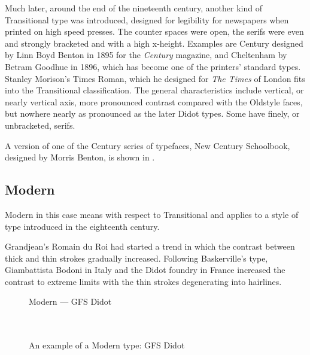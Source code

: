 \documentclass[10pt,letterpaper,extrafontsizes]{memoir}
\begin{document}
    Much later, around the end of the nineteenth century, another kind of 
Transitional type was introduced, designed for legibility for newspapers 
when printed on high speed presses. The counter spaces were open, the 
serifs were even and strongly bracketed and with a high x-height.
Examples are Century designed by 
 Linn Boyd Benton in 1895 for the \emph{Century}
magazine, and 
Cheltenham by Betram Goodhue 
in 1896, which has become one of the printers' standard types. Stanley
Morison's Times Roman, 
which he
designed for \emph{The Times} of London fits into the Transitional
classification. The general characteristics include vertical, or nearly
vertical axis, more pronounced contrast compared with the Oldstyle faces, but
nowhere nearly as pronounced as the later Didot types. Some have finely, or
unbracketed, serifs.

    A version of one of the Century 
series of typefaces, 
New Century Schoolbook, designed
by Morris Benton,
is shown in .

\subsection{Modern}

    Modern in this case means with respect to Transitional 
and applies to a style of type introduced in the eighteenth century.

    Grandjean's Romain du Roi had started a trend 
in which the contrast 
between thick and thin strokes gradually increased. Following Baskerville's
type, Giambattista Bodoni in Italy and the 
Didot foundry in France increased the contrast 
to extreme limits with the thin strokes degenerating into hairlines.

\begin{figure}
\centering
{\centering{}\selectfont
  Modern --- GFS Didot \\
  \UCalphabet \\
  \LCalphabet \\
  \fox\par}
\caption{An example of a Modern type: GFS Didot} 
   \label{fig:didot}
\end{figure}
\end{document}
